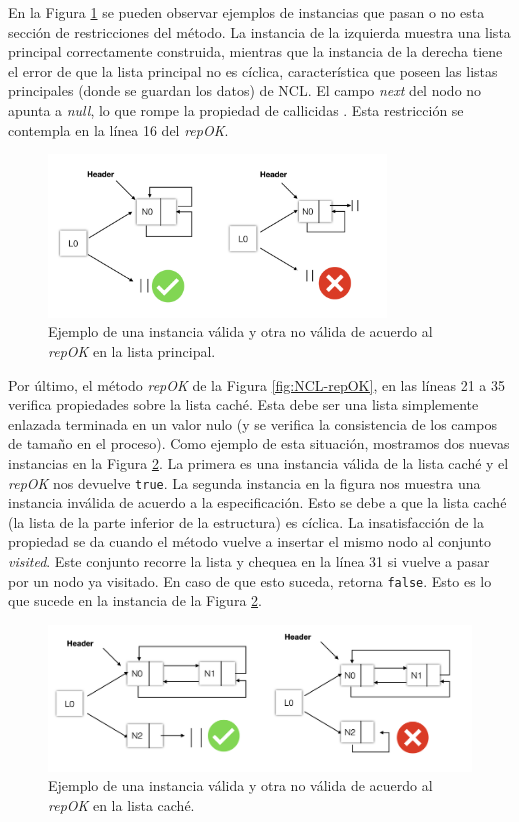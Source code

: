 En la Figura \ref{fig:repok2} se pueden observar ejemplos de instancias que pasan o no esta sección de restricciones del método. 
La instancia de la izquierda muestra una lista principal correctamente construida, mientras que la instancia de la derecha tiene el error de que la lista principal no es cíclica, 
característica que poseen las listas principales (donde se guardan los datos) de NCL. 
El campo \emph{next} del nodo no apunta a \emph{null}, lo que rompe la propiedad
de callicidas . 
Esta restricción se contempla en la línea 16 del \emph{repOK}.

\begin{figure}[H]
  \centering
  \includegraphics[width=0.8\textwidth]{images/repok2.jpg}
  \caption{Ejemplo de una instancia válida y otra no válida de acuerdo al \emph{repOK} en la lista principal.}
  \label{fig:repok2}
\end{figure}

Por último, el método \emph{repOK} de la Figura \ref{fig:NCL-repOK}, en las líneas 21 a 35 verifica propiedades sobre la lista caché. 
Esta debe ser una lista simplemente enlazada terminada en un valor nulo (y se verifica la consistencia de los campos de tamaño en el proceso). 
Como ejemplo de esta situación, mostramos dos nuevas instancias en la Figura \ref{fig:repok3}. 
La primera es una instancia válida de la lista caché y el \emph{repOK} nos devuelve \texttt{true}. 
La segunda instancia en la figura nos muestra una instancia inválida de acuerdo a la especificación. 
Esto se debe a que la lista caché (la lista de la parte inferior de la estructura) es cíclica. 
La insatisfacción de la propiedad se da cuando el método vuelve a insertar el mismo nodo al conjunto \emph{visited}. 
Este conjunto recorre la lista y chequea en la línea 31 si vuelve a pasar por un nodo ya visitado. 
En caso de que esto suceda, retorna \texttt{false}. Esto es lo que sucede en la instancia de la Figura \ref{fig:repok3}.

\begin{figure}[H]
  \centering
  \includegraphics[scale=0.3]{images/repok3.jpg}
  \caption{Ejemplo de una instancia válida y otra no válida de acuerdo al \emph{repOK} en la lista caché.}
  \label{fig:repok3}
\end{figure}

